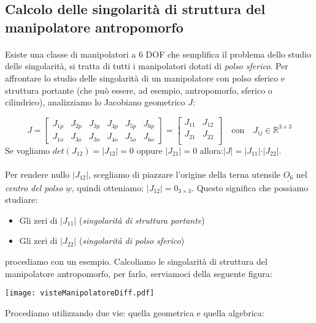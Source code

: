 \subsection{Calcolo delle singolarità di struttura del manipolatore antropomorfo}
\paragraph{}
Esiste una classe di manipolatori a 6 DOF che semplifica il problema dello studio delle singolarità, si tratta di tutti i manipolatori dotati di \emph{polso sferico}. Per affrontare lo studio delle singolarità di un manipolatore con polso sferico e struttura portante (che può essere, ad esempio, antropomorfo, sferico o cilindrico), analizziamo lo Jacobiano geometrico $J$:

\begin{equation}
	J = 
	\begin{bmatrix}
		J_{1p} & J_{2p} & J_{3p} & J_{4p} & J_{5p} & J_{6p} \\
		J_{1o} & J_{3o} & J_{3o} & J_{4o} & J_{5o} & J_{6o} 
	\end{bmatrix}
	=
	\begin{bmatrix}
		J_{11} & J_{12} \\
		J_{21} & J_{22} \\
	\end{bmatrix}
	\quad \text{con} \quad J_{ij}\in\mathbb{R}^{3 \times 3}
\end{equation}
Se vogliamo $det(J_{12}) = \vert J_{12} \vert = 0$ oppure $\vert J_{21} \vert = 0$ allora:$\vert J \vert = \vert J_{11} \vert \cdot \vert J_{22} \vert$.
\paragraph{}
Per rendere nullo $\vert J_{12} \vert$, scegliamo di piazzare l’origine della terna utensile $\underline{O_6}$ nel \emph{centro del polso} $\underline{w}$, quindi otteniamo: $\vert J_{12} \vert = 0_{3 \times 3}$. Questo significa che possiamo studiare:
\begin{itemize}
	\item Gli zeri di $\vert J_{11} \vert$ (\emph{singolarità di struttura portante})
	\item Gli zeri di $\vert J_{22} \vert$ (\emph{singolarità di polso sferico})
\end{itemize}
procediamo con un esempio.
Calcoliamo le singolarità di struttura del manipolatore antropomorfo, per farlo, serviamoci della seguente figura:
\begin{center}
\texttt{[image: visteManipolatoreDiff.pdf]}
\end{center}
Procediamo utilizzando due vie: quella geometrica e quella algebrica:

